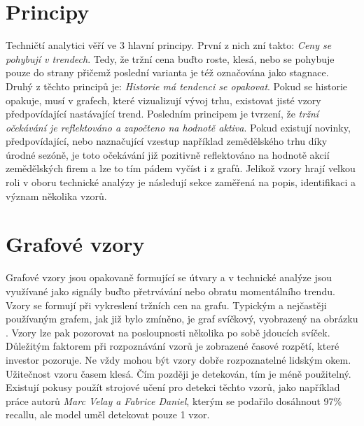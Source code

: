 \section{Principy}
Techničtí analytici věří ve 3 hlavní principy. První z nich zní takto: \emph{Ceny se pohybují v trendech}. Tedy, že tržní cena buďto roste, klesá, nebo se pohybuje
pouze do strany přičemž poslední varianta je též označována jako stagnace. Druhý z těchto principů je: \emph{Historie má tendenci se opakovat}. Pokud se historie
opakuje, musí v grafech, které vizualizují vývoj trhu, existovat jisté vzory předpovídající nastávající trend. Posledním principem je tvrzení, že \emph{tržní očekávání
    je reflektováno a započteno na hodnotě aktiva}. Pokud existují novinky, předpovídající, nebo naznačující vzestup například zemědělského trhu díky úrodné sezóně, je toto
očekávání již pozitivně reflektováno na hodnotě akcií zemědělských firem a lze to tím pádem vyčíst i z grafů. Jelikož vzory hrají velkou roli v oboru technické analýzy
je následují sekce zaměřená na popis, identifikaci a význam několika vzorů.


\section{Grafové vzory}
\label{sec:ChartPatterns}
Grafové vzory jsou opakovaně formující se útvary a v technické analýze jsou využívané jako signály buďto přetrvávání nebo obratu momentálního trendu. Vzory se formují při vykreslení
tržních cen na grafu. Typickým a nejčastěji používaným grafem, jak již bylo zmíněno, je graf svíčkový, vyobrazený na obrázku \iffalse TODO: Pridat referenci na obrazek grafu \ref{} \fi.
Vzory lze pak
pozorovat na posloupnosti několika po sobě jdoucích svíček. Důležitým faktorem při rozpoznávání vzorů je zobrazené časové rozpětí, které investor pozoruje. Ne vždy mohou
být vzory dobře rozpoznatelné lidským okem. Užitečnost vzoru časem klesá. Čím později je detekován, tím je méně použitelný.
Existují pokusy použít strojové učení pro detekci těchto vzorů, jako například práce autorů \emph{Marc Velay a Fabrice Daniel}, kterým
se podařilo dosáhnout 97\% recallu, ale model uměl detekovat pouze 1 vzor.


